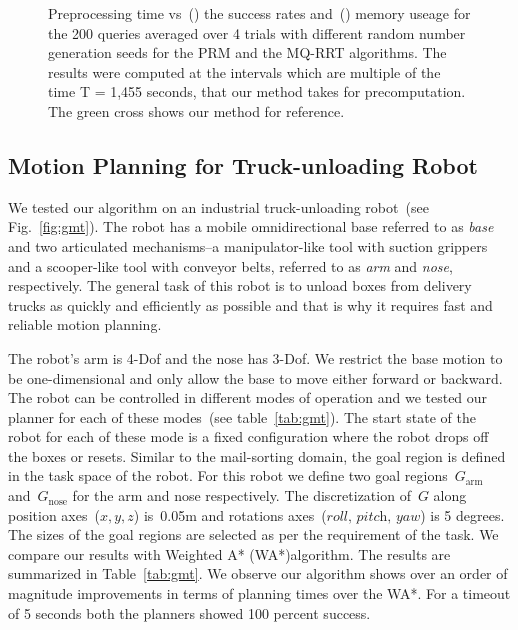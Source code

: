 \documentclass[a4paper]{report}
\begin{document}
\begin{figure}
\begin{subfigure}{0.5\textwidth}
\centering
  \caption{}
  \label{fig:success}
\end{subfigure}
\hfill
\begin{subfigure}{0.5\textwidth}
\centering
  \caption{}
  \label{fig:memory}
\end{subfigure}
    \caption{Preprocessing time vs~() the success rates and~() memory useage for the 200 queries averaged over 4 trials with different random number generation seeds for the PRM and the MQ-RRT algorithms. The results were computed at the intervals which are multiple of the time T = 1,455 seconds, that our method takes for precomputation. The green cross shows our method for reference.}
    \label{fig:plots}
\end{figure}

\subsection{Motion Planning for Truck-unloading Robot}
We tested our algorithm on an industrial truck-unloading robot~(see Fig.~\ref{fig:gmt}). The robot has a mobile omnidirectional base referred to as \textit{base} and two articulated mechanisms--a manipulator-like tool with suction grippers and a  scooper-like tool with conveyor belts, referred to as \textit{arm} and \textit{nose}, respectively. The general task of this robot is to unload boxes from delivery trucks as quickly and efficiently as possible and that is why it requires fast and reliable motion planning.

The robot's arm is 4-Dof and the nose has 3-Dof. We restrict the base motion to be one-dimensional and only allow the base to move either forward or backward. The robot can be controlled in different modes of operation and we tested our planner for each of these modes~(see table~\ref{tab:gmt}). The start state of the robot for each of these mode is a fixed configuration where the robot drops off the boxes or resets. Similar to the mail-sorting domain, the goal region is defined in the task space of the robot. For this robot we define two goal regions~$G_{\textrm{arm}}$ and~$G_{\textrm{nose}}$ for the arm and nose respectively. The discretization of~$G$ along position axes~($x,y,z$) is~0.05m and rotations axes~($\textit{roll, pitch, yaw}$) is 5 degrees. The sizes of the goal regions are selected as per the requirement of the task.
We compare our results with Weighted A* (WA*)algorithm. The results are summarized in Table~\ref{tab:gmt}. We observe our algorithm shows over an order of magnitude improvements in terms of planning times over the WA*. For a timeout of 5 seconds both the planners showed 100 percent success.
\end{document}
